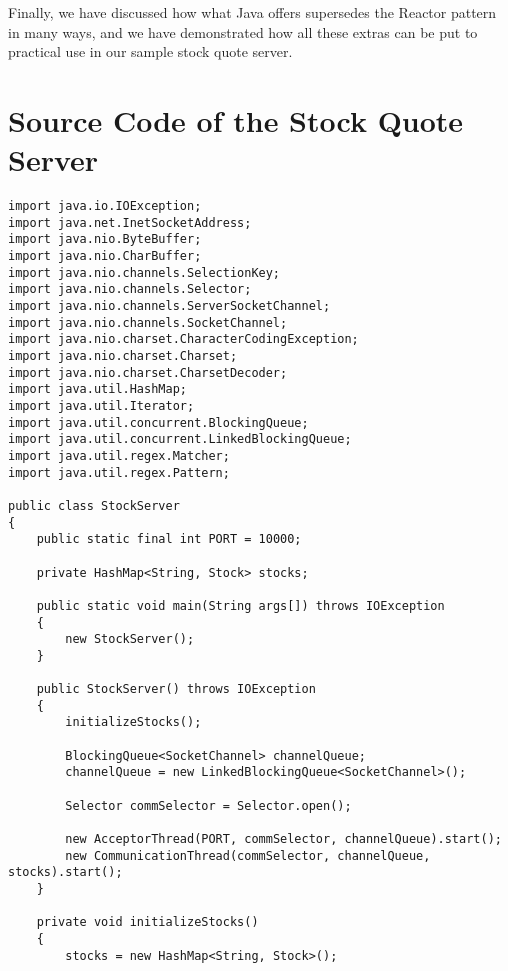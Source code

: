 \documentclass[a4paper,10pt]{article}
\begin{document}
Finally, we have discussed how what Java offers supersedes the Reactor pattern in many ways, and we have
demonstrated how all these extras can be put to practical use in our sample stock quote server.



\appendix

\section{Source Code of the Stock Quote Server}

\begin{verbatim}
import java.io.IOException;
import java.net.InetSocketAddress;
import java.nio.ByteBuffer;
import java.nio.CharBuffer;
import java.nio.channels.SelectionKey;
import java.nio.channels.Selector;
import java.nio.channels.ServerSocketChannel;
import java.nio.channels.SocketChannel;
import java.nio.charset.CharacterCodingException;
import java.nio.charset.Charset;
import java.nio.charset.CharsetDecoder;
import java.util.HashMap;
import java.util.Iterator;
import java.util.concurrent.BlockingQueue;
import java.util.concurrent.LinkedBlockingQueue;
import java.util.regex.Matcher;
import java.util.regex.Pattern;

public class StockServer
{
    public static final int PORT = 10000;

    private HashMap<String, Stock> stocks;

    public static void main(String args[]) throws IOException
    {
        new StockServer();
    }

    public StockServer() throws IOException
    {
        initializeStocks();

        BlockingQueue<SocketChannel> channelQueue;
        channelQueue = new LinkedBlockingQueue<SocketChannel>();

        Selector commSelector = Selector.open();

        new AcceptorThread(PORT, commSelector, channelQueue).start();
        new CommunicationThread(commSelector, channelQueue, stocks).start();
    }
    
    private void initializeStocks()
    {
        stocks = new HashMap<String, Stock>();


\end{verbatim}
\end{document}
